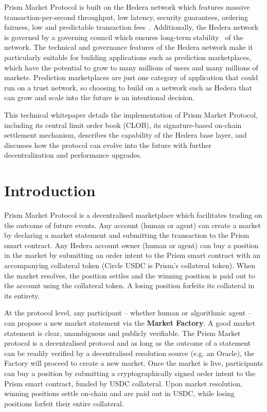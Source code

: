 \documentclass[11pt,a4paper]{article}
\begin{document}
Prism Market Protocol is built on the Hedera network which features massive transaction-per-second throughput, low latency, security guarantees, ordering fairness, low and predictable transaction fees~\cite{hedera_whitepaper}\cite{szabo1997}. Additionally, the Hedera network is governed by a governing council which ensures long-term stability~\cite{hedera_whitepaper} of the network. The technical and governance features of the Hedera network make it particularly suitable for building applications such as prediction marketplaces, which have the potential to grow to many millions of users and many millions of markets. Prediction marketplaces are just one category of application that could run on a trust network, so choosing to build on a network such as Hedera that can grow and scale into the future is an intentional decision.

This technical whitepaper details the implementation of Prism Market Protocol, including its central limit order book (CLOB), its signature-based on-chain settlement mechanism, describes the capability of the Hedera base layer, and discusses how the protocol can evolve into the future with further decentralization and performance upgrades.

\section{Introduction}

Prism Market Protocol is a decentralised marketplace which facilitates trading on the outcome of future events. Any account (human or agent) can create a market by declaring a market statement and submitting the transaction to the Prism smart contract. Any Hedera account owner (human or agent) can buy a position in the market by submitting an order intent to the Prism smart contract with an accompanying collateral token (Circle USDC is Prism's collateral token). When the market resolves, the position settles and the winning position is paid out to the account using the collateral token. A losing position forfeits its collateral in its entirety.

At the protocol level, any participant -- whether human or algorithmic agent -- can propose a new market statement via the \textbf{Market Factory}. A good market statement is clear, unambiguous and publicly verifiable. The Prism Market protocol is a decentralised protocol and as long as the outcome of a statement can be readily verified by a decentralised resolution source (e.g. an Oracle), the Factory will proceed to create a new market. Once the market is live, participants can buy a position by submitting a cryptographically signed order intent to the Prism smart contract, funded by USDC collateral. Upon market resolution, winning positions settle on-chain and are paid out in USDC, while losing positions forfeit their entire collateral.
\end{document}
